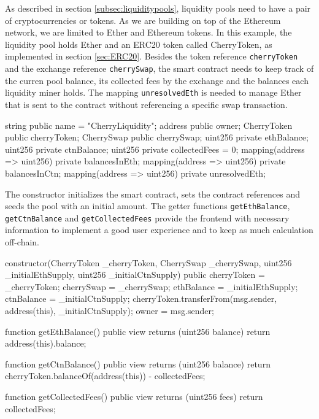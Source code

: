 As described in section \ref{subsec:liquiditypools}, liquidity pools need to have a pair of cryptocurrencies or tokens. As we are building on top of the Ethereum network, we are limited to Ether and Ethereum tokens. In this example, the liquidity pool holds Ether and an ERC20 token called CherryToken, as implemented in section \ref{sec:ERC20}. Besides the token reference \texttt{cherryToken} and the exchange reference \texttt{cherrySwap}, the smart contract needs to keep track of the curren pool balance, its collected fees by the exchange and the balances each liquidity miner holds. The mapping \texttt{unresolvedEth} is needed to manage Ether that is sent to the contract without referencing a specific swap transaction.
\begin{GenericCode}
string public name = "CherryLiquidity";
address public owner;
CherryToken public cherryToken;
CherrySwap public cherrySwap;
uint256 private ethBalance;
uint256 private ctnBalance;
uint256 private collectedFees = 0;
mapping(address => uint256) private balancesInEth;
mapping(address => uint256) private balancesInCtn;
mapping(address => uint256) private unresolvedEth;
\end{GenericCode}

The constructor initializes the smart contract, sets the contract references and seeds the pool with an initial amount. The getter functions \texttt{getEthBalance}, \texttt{getCtnBalance} and \texttt{getCollectedFees} provide the frontend with necessary information to implement a good user experience and to keep as much calculation off-chain.
\begin{GenericCode}
constructor(CherryToken _cherryToken, CherrySwap _cherrySwap, uint256 _initialEthSupply, uint256 _initialCtnSupply) public {
  cherryToken = _cherryToken;
  cherrySwap = _cherrySwap;
  ethBalance = _initialEthSupply;
  ctnBalance = _initialCtnSupply;
  cherryToken.transferFrom(msg.sender, address(this), _initialCtnSupply);
  owner = msg.sender;
}

function getEthBalance() public view returns (uint256 balance) {
  return address(this).balance;
}

function getCtnBalance() public view returns (uint256 balance) {
  return cherryToken.balanceOf(address(this)) - collectedFees;
}

function getCollectedFees() public view returns (uint256 fees) {
  return collectedFees;
}
\end{GenericCode}

